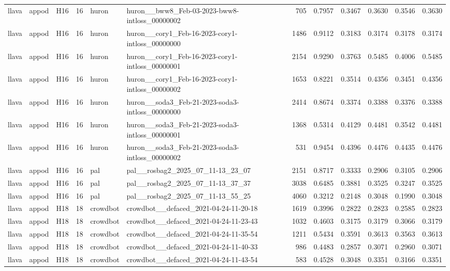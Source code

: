 \begin{table}[tbp]
\begin{tabular}{lllrllrrrrrr}
llava & appod & H16 & 16 & huron & huron\_\_bww8\_Feb-03-2023-bww8-intloss\_00000002 & 705 & 0.7957 & 0.3467 & 0.3630 & 0.3546 & 0.3630 \\
llava & appod & H16 & 16 & huron & huron\_\_cory1\_Feb-16-2023-cory1-intloss\_00000000 & 1486 & 0.9112 & 0.3183 & 0.3174 & 0.3178 & 0.3174 \\
llava & appod & H16 & 16 & huron & huron\_\_cory1\_Feb-16-2023-cory1-intloss\_00000001 & 2154 & 0.9290 & 0.3763 & 0.5485 & 0.4006 & 0.5485 \\
llava & appod & H16 & 16 & huron & huron\_\_cory1\_Feb-16-2023-cory1-intloss\_00000002 & 1653 & 0.8221 & 0.3514 & 0.4356 & 0.3451 & 0.4356 \\
llava & appod & H16 & 16 & huron & huron\_\_soda3\_Feb-21-2023-soda3-intloss\_00000000 & 2414 & 0.8674 & 0.3374 & 0.3388 & 0.3376 & 0.3388 \\
llava & appod & H16 & 16 & huron & huron\_\_soda3\_Feb-21-2023-soda3-intloss\_00000001 & 1368 & 0.5314 & 0.4129 & 0.4481 & 0.3542 & 0.4481 \\
llava & appod & H16 & 16 & huron & huron\_\_soda3\_Feb-21-2023-soda3-intloss\_00000002 & 531 & 0.9454 & 0.4396 & 0.4476 & 0.4435 & 0.4476 \\
llava & appod & H16 & 16 & pal & pal\_\_rosbag2\_2025\_07\_11-13\_23\_07 & 2151 & 0.8717 & 0.3333 & 0.2906 & 0.3105 & 0.2906 \\
llava & appod & H16 & 16 & pal & pal\_\_rosbag2\_2025\_07\_11-13\_37\_37 & 3038 & 0.6485 & 0.3881 & 0.3525 & 0.3247 & 0.3525 \\
llava & appod & H16 & 16 & pal & pal\_\_rosbag2\_2025\_07\_11-13\_55\_25 & 4060 & 0.3212 & 0.2148 & 0.3048 & 0.1990 & 0.3048 \\
llava & appod & H18 & 18 & crowdbot & crowdbot\_\_defaced\_2021-04-24-11-20-18 & 1619 & 0.3996 & 0.2822 & 0.2823 & 0.2585 & 0.2823 \\
llava & appod & H18 & 18 & crowdbot & crowdbot\_\_defaced\_2021-04-24-11-23-43 & 1032 & 0.4603 & 0.3175 & 0.3179 & 0.3066 & 0.3179 \\
llava & appod & H18 & 18 & crowdbot & crowdbot\_\_defaced\_2021-04-24-11-35-54 & 1211 & 0.5434 & 0.3591 & 0.3613 & 0.3563 & 0.3613 \\
llava & appod & H18 & 18 & crowdbot & crowdbot\_\_defaced\_2021-04-24-11-40-33 & 986 & 0.4483 & 0.2857 & 0.3071 & 0.2960 & 0.3071 \\
llava & appod & H18 & 18 & crowdbot & crowdbot\_\_defaced\_2021-04-24-11-43-54 & 583 & 0.4528 & 0.3048 & 0.3351 & 0.3166 & 0.3351 \\

\end{tabular}
\end{table}
